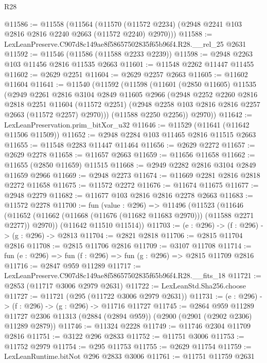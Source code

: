 \begin{lexlean}{R28}
\begin{coremodule}
@11586 := @11558
    (@11564 (@11570 (@11572 @2234) (@2948 @2241 @103 @2816 @2816 @2240 @2663 (@11572 @2240) @2970)))
@11588 := LexLeanPreserve.C907d8c149ae8f58657502835f65b96f4.R28.__rel_25 @2631
@11592 := @11546 (@11586 (@11588 @2233 @2239))
@11598 := @2948 @2263 @103 @11456 @2816 @11535 @2663
@11601 := @11548 @2262 @11447 @11455
@11602 := @2629 @2251
@11604 := @2629 @2257 @2663
@11605 := @11602 @11604
@11641 := @11540
    (@11592
      (@11598
        (@11601
          (@2850 @11605)
          @11535
          (@2949
            @2261
            @2816
            @3104
            @2849
            @11605
            @2966
            (@2948
              @2252
              @2260
              @2816
              @2818
              @2251
              @11604
              (@11572 @2251)
              (@2948 @2258 @103 @2816 @2816 @2257 @2663 (@11572 @2257) @2970)))
          (@11588 @2250 @2256))
        @2970))
@11642 := LexLeanPreservation.prim_bitXor_u32
@11646 := @11529 (@11641 (@11642 @11506 @11509))
@11652 := @2948 @2284 @103 @11465 @2816 @11515 @2663
@11655 := @11548 @2283 @11447 @11464
@11656 := @2629 @2272
@11657 := @2629 @2278
@11658 := @11657 @2663
@11659 := @11656 @11658
@11662 := @11655 (@2850 @11659) @11515
@11668 := @2949 @2282 @2816 @3104 @2849 @11659 @2966
@11669 := @2948 @2273
@11674 := @11669 @2281 @2816 @2818 @2272 @11658
@11675 := @11572 @2272
@11676 := @11674 @11675
@11677 := @2948 @2279
@11682 := @11677 @103 @2816 @2816 @2278 @2663
@11683 := @11572 @2278
@11700 := fun (value : @296) =>
  @11496
    (@11523
      (@11646 (@11652 (@11662 (@11668 (@11676 (@11682 @11683 @2970))) (@11588 @2271 @2277)) @2970))
      (@11642 @11510 @11514))
@11703 := (e : @296) -> (f : @296) -> (g : @296) -> @2813
@11704 := @2821 @2818
@11706 := @2815 @11704 @2816
@11708 := @2815 @11706 @2816
@11709 := @3107 @11708
@11714 := fun (e : @296) => fun (f : @296) => fun (g : @296) => @2815 @11709 @2816
@11716 := @2847 @959 @11289
@11717 := LexLeanPreserve.C907d8c149ae8f58657502835f65b96f4.R28.__fits_18
@11721 := @2853 (@11717 @3006 @2979 @2631)
@11722 := LexLeanStd.Sha256.choose
@11727 := @11721 (@295 (@11722 @3006 @2979 @2631))
@11731 := (e : @296) -> (f : @296) -> (g : @296) -> @11716 @11727
@11745 := @2864
    @959
    @11289
    @11727
    @2306
    @11313
    (@2884 (@2894 @959))
    (@2900 (@2901 (@2902 @2306) @11289 @2879))
@11746 := @11324 @2228
@11749 := @11746 @2304 @11709 @2816
@11751 := @3122 @296 @2833
@11752 := @11751 @3006
@11753 := @11752 @2979
@11754 := @295 @11753
@11755 := @2629 @11754
@11759 := LexLeanRuntime.bitNot @296 @2833 @3006
@11761 := @11751 @11759 @2631

\end{coremodule}
\end{lexlean}

